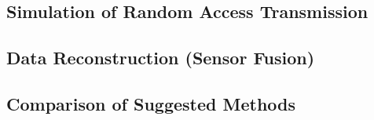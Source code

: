\documentclass[Main]{subfiles}
\begin{document}

	\subsection{Simulation of Random Access Transmission} %
	\label{sub:simulation_of_random_access_transmission}



	

	\subsection{Data Reconstruction (Sensor Fusion)} %
	\label{sub:data_reconstruction}
	

	
	\subsection{Comparison of Suggested Methods} %
	\label{sub:comparison_of_suggested_methods}

	

\end{document}
